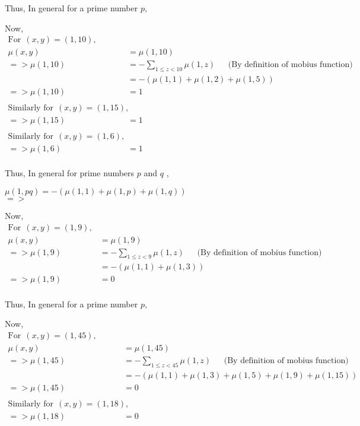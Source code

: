 Thus, In general for a prime number $p$,

\begin{center}
\end{center}

Now,
\begin{align*}
\textrm{For} ~~(x,y) = (1,10),\\
    \mu (x,y) &= \mu (1,10)\\
=>  \mu (1,10) &= -\sum\limits_{1 \le z < 10} \mu(1,z)    ~~~~~~~\textrm{(By definition of mobius function)}\\
    &= - (\mu(1,1) + \mu(1,2) + \mu(1,5)) \\
=>  \mu(1,10) &= 1\\\\
\textrm{Similarly for} ~~(x,y) = (1,15),\\
=> \mu(1,15) &= 1\\\\
\textrm{Similarly for} ~~(x,y) = (1,6),\\
=> \mu(1,6) &= 1\\
\end{align*}

Thus, In general for prime numbers $p$ and $q$ ,
\begin{center}
    $\mu(1,p q) = -(\mu(1,1) + \mu(1,p) + \mu(1,q))$\\
    $=>$
\end{center}

\noindent Now,
\begin{align*}
\textrm{For} ~~(x,y) = (1,9),\\
    \mu (x,y) &= \mu (1,9)\\
=>  \mu (1,9) &= -\sum\limits_{1 \le z < 9} \mu(1,z)    ~~~~~~~\textrm{(By definition of mobius function)}\\
    &= - (\mu(1,1) + \mu(1,3)) \\
=>  \mu(1,9) &= 0\\
\end{align*}

Thus, In general for a prime number $p$,

\begin{center}
\end{center}

\noindent Now,
\begin{align*}
\textrm{For} ~~(x,y) = (1,45),\\
    \mu (x,y) &= \mu (1,45)\\
=>  \mu (1,45) &= -\sum\limits_{1 \le z < 45} \mu(1,z)    ~~~~~~~\textrm{(By definition of mobius function)}\\
    &= - (\mu(1,1) + \mu(1,3) + \mu(1,5) + \mu(1,9) + \mu(1,15)) \\
=>  \mu(1,45) &= 0\\\\
\textrm{Similarly for} ~~(x,y) = (1,18),\\
=> \mu(1,18) &= 0\\
\end{align*}

